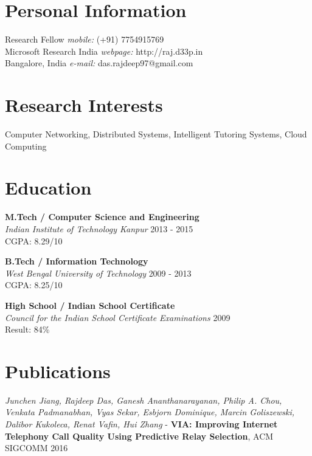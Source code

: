 \documentclass[margin,line]{res}
\begin{document}

\begin{resume}
\section{\sc Personal Information}

Research Fellow            {\hfill {\it mobile:}  (+91) 7754915769} \\       
  Microsoft Research India    {\hfill{\it webpage:} http://raj.d33p.in}
    \\              
Bangalore, India
    {\hfill {\it e-mail:}  das.rajdeep97@gmail.com}\\     



\section{\sc Research Interests}
Computer Networking, Distributed Systems, Intelligent Tutoring Systems, Cloud Computing

\section{\sc Education}

{\bf M.Tech / Computer Science and Engineering} \\
{\em Indian Institute of Technology Kanpur }{\hfill}2013 - 2015 \\
\vspace*{-.1in}
CGPA: 8.29/10
\vspace*{.05in}

{\bf B.Tech / Information Technology} \\
{\em West Bengal University of Technology }{\hfill}2009 - 2013 \\
\vspace*{-.1in}
CGPA: 8.25/10
\vspace*{.05in}

{\bf High School / Indian School Certificate} \\
{\em Council for the Indian School Certificate Examinations }{\hfill}2009 \\
\vspace*{-.1in}
Result: 84\%
\vspace*{.05in}

\section{\sc Publications}
{\em Junchen Jiang, Rajdeep Das, Ganesh Ananthanarayanan, Philip A. Chou, Venkata Padmanabhan, Vyas Sekar, Esbjorn Dominique, Marcin Goliszewski, Dalibor Kukoleca, Renat Vafin, Hui Zhang} - 
{\bf VIA: Improving Internet Telephony Call Quality Using Predictive Relay Selection}, ACM SIGCOMM 2016


\end{resume}
\end{document}
